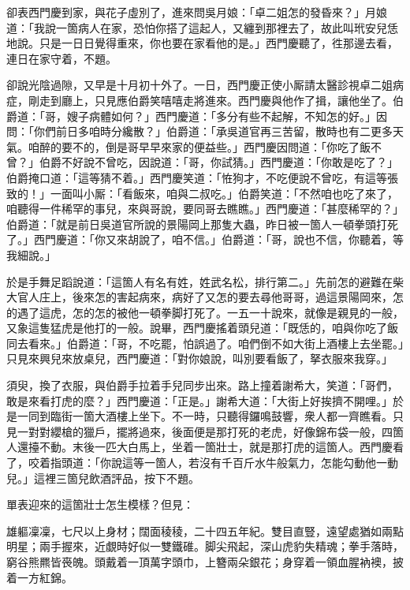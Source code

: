 卻表西門慶到家，與花子虛別了，進來問吳月娘：「卓二姐怎的發昏來？」月娘道：「我說一箇病人在家，恐怕你搭了這起人，又纏到那裡去了，故此叫玳安兒恁地說。只是一日日覺得重來，你也要在家看他的是。」西門慶聽了，徃那邊去看，連日在家守着，不題。

卻說光陰過隙，又早是十月初十外了。一日，西門慶正使小厮請太醫診視卓二姐病症，剛走到廳上，只見應伯爵笑嘻嘻走將進來。西門慶與他作了揖，讓他坐了。伯爵道：「哥，嫂子病體如何？」西門慶道：「多分有些不起解，不知怎的好。」因問：「你們前日多咱時分纔散？」伯爵道：「承吳道官再三苦留，散時也有二更多天氣。咱醉的要不的，倒是哥早早來家的便益些。」西門慶因問道：「你吃了飯不曾？」伯爵不好說不曾吃，因說道：「哥，你試猜。」西門慶道：「你敢是吃了？」伯爵掩口道：「這等猜不着。」{}西門慶笑道：「恠狗才，不吃便說不曾吃，有這等張致的！」一面叫小厮：「看飯來，咱與二叔吃。」伯爵笑道：「不然咱也吃了來了，咱聽得一件稀罕的事兒，來與哥說，要同哥去瞧瞧。」西門慶道：「甚麼稀罕的？」伯爵道：「就是前日吳道官所說的景陽岡上那隻大蟲，昨日被一箇人一頓拳頭打死了。」西門慶道：「你又來胡說了，咱不信。」伯爵道：「哥，說也不信，你聽着，等我細說。」

於是手舞足蹈說道：「這箇人有名有姓，姓武名松，排行第二。」先前怎的避難在柴大官人庄上，後來怎的害起病來，病好了又怎的要去尋他哥哥，過這景陽岡來，怎的遇了這虎，怎的怎的被他一頓拳脚打死了。一五一十說來，就像是親見的一般，又象這隻猛虎是他打的一般。說畢，西門慶搖着頭兒道：「既恁的，咱與你吃了飯同去看來。」伯爵道：「哥，不吃罷，怕誤過了。咱們倒不如大街上酒樓上去坐罷。」只見來興兒來放桌兒，西門慶道：「對你娘說，叫別要看飯了，拏衣服來我穿。」

須臾，換了衣服，與伯爵手拉着手兒同步出來。路上撞着謝希大，笑道：「哥們，敢是來看打虎的麼？」西門慶道：「正是。」謝希大道：「大街上好挨擠不開哩。」於是一同到臨街一箇大酒樓上坐下。不一時，只聽得鑼鳴鼓響，衆人都一齊瞧看。只見一對對纓槍的獵戶，擺將過來，後面便是那打死的老虎，好像錦布袋一般，四箇人還擡不動。末後一匹大白馬上，坐着一箇壯士，就是那打虎的這箇人。西門慶看了，咬着指頭道：「你說這等一箇人，若沒有千百斤水牛般氣力，怎能勾動他一動兒。」{}這裡三箇兒飲酒評品，按下不題。

單表迎來的這箇壯士怎生模樣？但見：

\begin{myquote}
雄軀凜凜，七尺以上身材；闊面稜稜，二十四五年紀。雙目直豎，遠望處猶如兩點明星；兩手握來，近覷時好似一雙鐵碓。脚尖飛起，深山虎豹失精魂；拳手落時，窮谷熊羆皆䘮魄。頭戴着一頂萬字頭巾，上簪兩朵銀花；身穿着一領血腥衲襖，披着一方紅錦。
\end{myquote}

